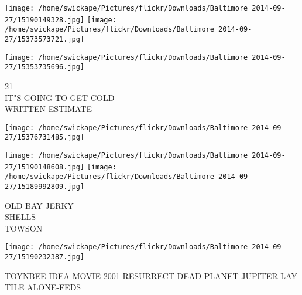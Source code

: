 \documentclass[10pt,letterpaper]{article}
\begin{document}
\texttt{[image: /home/swickape/Pictures/flickr/Downloads/Baltimore 2014-09-27/15190149328.jpg]}
\texttt{[image: /home/swickape/Pictures/flickr/Downloads/Baltimore 2014-09-27/15373573721.jpg]}

\texttt{[image: /home/swickape/Pictures/flickr/Downloads/Baltimore 2014-09-27/15353735696.jpg]}

21+\\
IT"S GOING TO GET COLD\\
WRITTEN ESTIMATE
\pagebreak

\texttt{[image: /home/swickape/Pictures/flickr/Downloads/Baltimore 2014-09-27/15376731485.jpg]}

\vspace{0.25in}
\texttt{[image: /home/swickape/Pictures/flickr/Downloads/Baltimore 2014-09-27/15190148608.jpg]}
\texttt{[image: /home/swickape/Pictures/flickr/Downloads/Baltimore 2014-09-27/15189992809.jpg]}

OLD BAY JERKY\\
SHELLS\\
TOWSON
\pagebreak

\texttt{[image: /home/swickape/Pictures/flickr/Downloads/Baltimore 2014-09-27/15190232387.jpg]}

TOYNBEE IDEA MOVIE 2001 RESURRECT DEAD PLANET JUPITER LAY TILE ALONE{-}FEDS
\pagebreak
\end{document}

